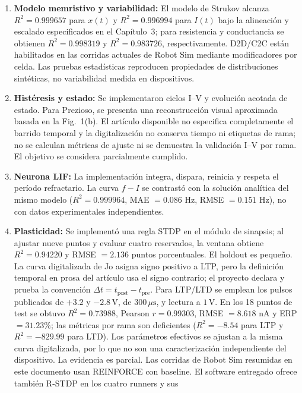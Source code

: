 \begin{enumerate}
    \item \textbf{Modelo memristivo y variabilidad:} El modelo de Strukov
    alcanza $R^2=0.999657$ para $x(t)$ y $R^2=0.996994$ para $I(t)$ bajo la
    alineación y escalado especificados en el Capítulo~3; para resistencia
    y conductancia se obtienen $R^2=0.998319$ y $R^2=0.983726$,
    respectivamente. D2D/C2C están habilitados en las corridas actuales de
    Robot Sim mediante modificadores por celda. Las pruebas estadísticas
    reproducen propiedades de distribuciones sintéticas, no variabilidad
    medida en dispositivos.
    \item \textbf{Histéresis y estado:} Se implementaron ciclos I--V y
    evolución acotada de estado. Para Prezioso, se presenta una
    reconstrucción visual aproximada basada en la Fig.~1(b). El artículo
    disponible no especifica completamente el barrido temporal y la
    digitalización no conserva tiempo ni etiquetas de rama; no se calculan
    métricas de ajuste ni se demuestra la validación I--V por rama. El
    objetivo se considera parcialmente cumplido.
    \item \textbf{Neurona LIF:} La implementación integra, dispara, reinicia y
    respeta el período refractario. La curva $f-I$ se contrastó con la solución
    analítica del mismo modelo ($R^2=0.999964$, MAE $=0.086$ Hz,
    RMSE $=0.151$ Hz), no con datos experimentales independientes.
    \item \textbf{Plasticidad:} Se implementó una regla STDP en el módulo de
    sinapsis; al ajustar nueve puntos y evaluar cuatro reservados, la ventana
    obtiene $R^2=0.94220$ y RMSE $=2.136$ puntos porcentuales. El holdout es
    pequeño. La curva digitalizada de Jo asigna signo positivo a LTP, pero
    la definición temporal en prosa del artículo usa el signo contrario;
    el proyecto declara y prueba la convención
    $\Delta t=t_{\mathrm{post}}-t_{\mathrm{pre}}$. Para LTP/LTD se emplean
    los pulsos publicados de $+3.2$ y $-2.8\,\mathrm{V}$, de
    $300\,\mu\mathrm{s}$, y lectura a $1\,\mathrm{V}$. En los 18 puntos de
    test se obtuvo $R^2=0.73988$, Pearson $r=0.99303$,
    RMSE $=8.618$ nA y ERP $=31.23\%$;
    las métricas por rama son deficientes ($R^2=-8.54$ para LTP y
    $R^2=-829.99$ para LTD). Los parámetros efectivos se ajustan a la
    misma curva digitalizada, por lo que no son una caracterización
    independiente del dispositivo. La evidencia es parcial. Las
    corridas de Robot Sim resumidas en este documento usan REINFORCE con
    baseline. El software entregado ofrece tambi\'en R-STDP en los cuatro runners y sus

\end{enumerate}
